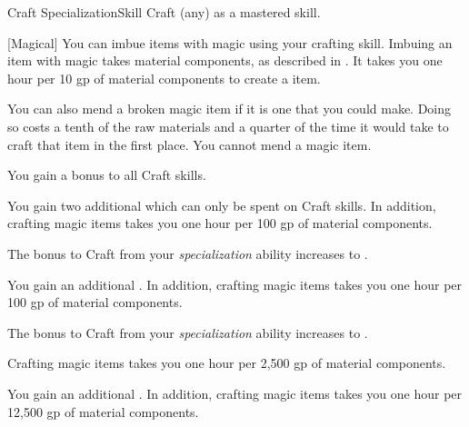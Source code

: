     \begin{feat}{Craft Specialization}{Skill}
        \featpre Craft (any) as a mastered skill.

        [Magical] You can imbue items with magic using your crafting skill.
        Imbuing an item with magic takes material components, as described in .
        It takes you one hour per 10 gp of material components to create a item.

        You can also mend a broken magic item if it is one that you could make.
        Doing so costs a tenth of the raw materials and a quarter of the time it would take to craft that item in the first place.
        You cannot mend a  magic item.

         You gain a  bonus to all Craft skills.

         You gain two additional  which can only be spent on Craft skills.
        In addition, crafting magic items takes you one hour per 100 gp of material components.

         The bonus to Craft from your \textit{specialization} ability increases to .

         You gain an additional .
        In addition, crafting magic items takes you one hour per 100 gp of material components.

         The bonus to Craft from your \textit{specialization} ability increases to .

        \ff[17]{}
        Crafting magic items takes you one hour per 2,500 gp of material components.

         You gain an additional .
        In addition, crafting magic items takes you one hour per 12,500 gp of material components.
    \end{feat}

